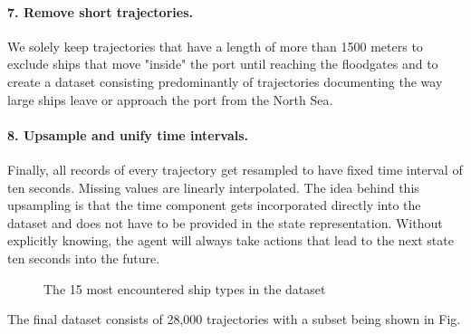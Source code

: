 \paragraph{7. Remove short trajectories.}
We solely keep trajectories that have a length of more than 1500 meters to  exclude ships that move "inside" the port until reaching the floodgates and to create a dataset consisting predominantly of trajectories documenting the way large ships leave or approach the port from the North Sea.

\paragraph{8. Upsample and unify time intervals.}
Finally, all records of every trajectory get resampled to have fixed time interval of ten seconds. Missing values are linearly interpolated. The idea behind this upsampling is that the time component gets incorporated directly into the dataset and does not have to be provided in the state representation. Without explicitly knowing, the agent will always take actions that lead to the next state ten seconds into the future.
\par

\begin{figure}[H]
    \centering
    
    \caption{The 15 most encountered ship types in the dataset}
    \label{fig:shipTypes}
\end{figure}
The final dataset consists of 28,000 trajectories with a subset being shown in Fig. %
